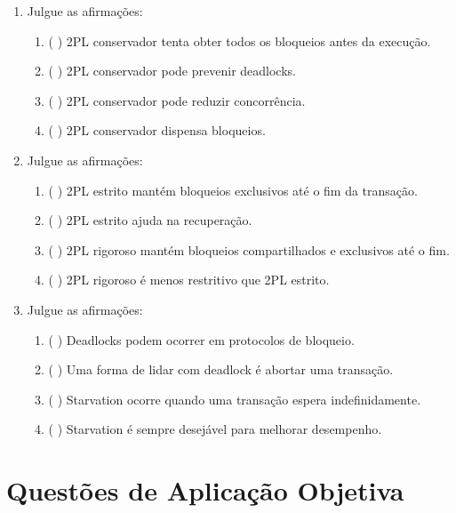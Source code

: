 \documentclass[12pt,a4paper]{article}
\begin{document}
\begin{enumerate}[resume,label=\textbf{Q\arabic*.}]
\item Julgue as afirmações:

\begin{enumerate}[label=\alph*)]
    \item ( \quad ) 2PL conservador tenta obter todos os bloqueios antes da execução.
    \item ( \quad ) 2PL conservador pode prevenir deadlocks.
    \item ( \quad ) 2PL conservador pode reduzir concorrência.
    \item ( \quad ) 2PL conservador dispensa bloqueios.
\end{enumerate}

\item Julgue as afirmações:

\begin{enumerate}[label=\alph*)]
    \item ( \quad ) 2PL estrito mantém bloqueios exclusivos até o fim da transação.
    \item ( \quad ) 2PL estrito ajuda na recuperação.
    \item ( \quad ) 2PL rigoroso mantém bloqueios compartilhados e exclusivos até o fim.
    \item ( \quad ) 2PL rigoroso é menos restritivo que 2PL estrito.
\end{enumerate}

\item Julgue as afirmações:

\begin{enumerate}[label=\alph*)]
    \item ( \quad ) Deadlocks podem ocorrer em protocolos de bloqueio.
    \item ( \quad ) Uma forma de lidar com deadlock é abortar uma transação.
    \item ( \quad ) Starvation ocorre quando uma transação espera indefinidamente.
    \item ( \quad ) Starvation é sempre desejável para melhorar desempenho.
\end{enumerate}

\end{enumerate}

\section{Questões de Aplicação Objetiva}
\end{document}
